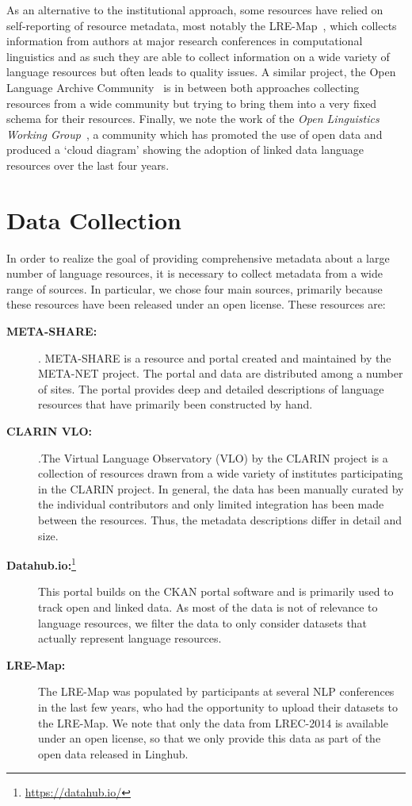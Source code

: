 \documentclass[smallextended]{svjour3}       %
\begin{document}
As an alternative to the institutional approach, some resources have relied on
self-reporting of resource metadata, most notably the
LRE-Map~\cite{calzolari2012lre}, which collects information from authors at
major research conferences in computational linguistics and as such they are
able to collect information on a wide variety of language resources but often
leads to quality issues. A similar project, the Open Language Archive
Community~\cite[OLAC]{piperidis2012meta} is in between both approaches collecting
resources from a wide community but trying to bring them into a very fixed
schema for their resources. Finally, we note the work of the \emph{Open
Linguistics Working Group}~\cite{chiarcos2012open}, a community which has
promoted the use of open data and produced a `cloud diagram' showing the
adoption of linked data language resources over the last four years.


\section{Data Collection}
\label{data-collection}

In order to realize the goal of providing comprehensive metadata about a large 
number of language
resources, it is necessary to collect metadata from a wide range of sources. In
particular, we chose four main sources, primarily because these resources have
been released under an open license. These resources are:

\begin{description}
    \item[\textbf{META-SHARE:}]. META-SHARE is a resource and portal created and
        maintained by the META-NET project. The portal and data are distributed
        among a number of sites. The portal
        provides deep and detailed descriptions of language resources that have
        primarily been constructed by hand.
    \item[\textbf{CLARIN VLO:}].The Virtual Language Observatory (VLO) by the CLARIN
        project is a collection of resources drawn from a wide variety of
        institutes participating in the CLARIN project. In general, the data has been
        manually curated by the individual contributors and only limited
        integration has been made between the resources. Thus, the metadata descriptions differ in detail and size.
    \item[\textbf{Datahub.io:}\footnote{\url{https://datahub.io/}}] This portal
        builds on the CKAN portal software and is primarily used to track 
        open and linked data. As most of the data is not of relevance to language
        resources, we filter the data to only consider datasets that actually represent language resources.
    \item[\textbf{LRE-Map:}] The LRE-Map was populated by participants at several
        NLP conferences in the last few years, who had the opportunity to upload
        their datasets to the LRE-Map. We note that only the data from LREC-2014
        is available under an open license, so that we only provide this data as
        part of the open data released in Linghub. 
\end{description}
\end{document}
